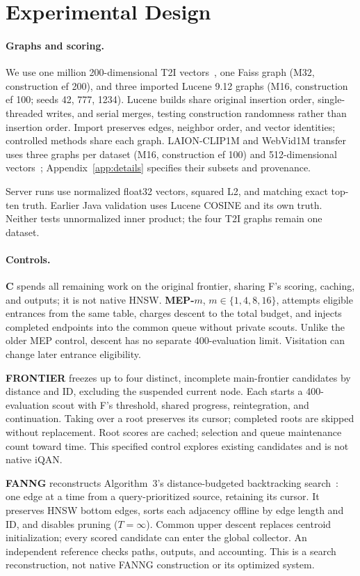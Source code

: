 \section{Experimental Design}\label{sec:design}
\paragraph{Graphs and scoring.}
We use one million 200-dimensional T2I vectors~\cite{t2i}, one Faiss graph (M32, construction ef 200), and three imported Lucene 9.12 graphs (M16, construction ef 100; seeds 42, 777, 1234). Lucene builds share original insertion order, single-threaded writes, and serial merges, testing construction randomness rather than insertion order. Import preserves edges, neighbor order, and vector identities; controlled methods share each graph. LAION-CLIP1M and WebVid1M transfer uses three graphs per dataset (M16, construction ef 100) and 512-dimensional vectors~\cite{laion,webvid}; Appendix~\ref{app:details} specifies their subsets and provenance.

Server runs use normalized float32 vectors, squared L2, and matching exact top-ten truth. Earlier Java validation uses Lucene COSINE and its own truth. Neither tests unnormalized inner product; the four T2I graphs remain one dataset.

\paragraph{Controls.}
\textbf{C} spends all remaining work on the original frontier, sharing F's scoring, caching, and outputs; it is not native HNSW. \textbf{MEP-$m$}, $m\in\{1,4,8,16\}$, attempts eligible entrances from the same table, charges descent to the total budget, and injects completed endpoints into the common queue without private scouts. Unlike the older MEP control, descent has no separate 400-evaluation limit. Visitation can change later entrance eligibility.

\textbf{FRONTIER} freezes up to four distinct, incomplete main-frontier candidates by distance and ID, excluding the suspended current node. Each starts a 400-evaluation scout with F's threshold, shared progress, reintegration, and continuation. Taking over a root preserves its cursor; completed roots are skipped without replacement. Root scores are cached; selection and queue maintenance count toward time. This specified control explores existing candidates and is not native iQAN.

\textbf{FANNG} reconstructs Algorithm~3's distance-budgeted backtracking search~\cite{fanng}: one edge at a time from a query-prioritized source, retaining its cursor. It preserves HNSW bottom edges, sorts each adjacency offline by edge length and ID, and disables pruning ($T=\infty$). Common upper descent replaces centroid initialization; every scored candidate can enter the global collector. An independent reference checks paths, outputs, and accounting. This is a search reconstruction, not native FANNG construction or its optimized system.

